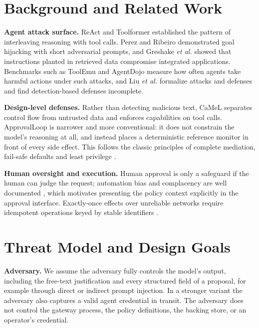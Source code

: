 \documentclass[conference]{IEEEtran}
\begin{document}
\section{Background and Related Work}
\textbf{Agent attack surface.} ReAct \cite{yao2023react} and Toolformer \cite{schick2023toolformer} established the pattern of interleaving reasoning with tool calls. Perez and Ribeiro \cite{perez2022ignore} demonstrated goal hijacking with short adversarial prompts, and Greshake \emph{et al.} \cite{greshake2023indirect} showed that instructions planted in retrieved data compromise integrated applications. Benchmarks such as ToolEmu \cite{ruan2024toolemu} and AgentDojo \cite{debenedetti2024agentdojo} measure how often agents take harmful actions under such attacks, and Liu \emph{et al.} \cite{liu2024formalizing} formalize attacks and defenses and find detection-based defenses incomplete.

\textbf{Design-level defenses.} Rather than detecting malicious text, CaMeL \cite{debenedetti2025camel} separates control flow from untrusted data and enforces capabilities on tool calls. ApprovalLoop is narrower and more conventional: it does not constrain the model's reasoning at all, and instead places a deterministic reference monitor in front of every side effect. This follows the classic principles of complete mediation, fail-safe defaults and least privilege \cite{saltzer1975protection}.

\textbf{Human oversight and execution.} Human approval is only a safeguard if the human can judge the request; automation bias and complacency are well documented \cite{parasuraman2010complacency}, which motivates presenting the policy context explicitly in the approval interface. Exactly-once effects over unreliable networks require idempotent operations keyed by stable identifiers \cite{helland2012idempotence,kleppmann2017ddia}.

\section{Threat Model and Design Goals}
\textbf{Adversary.} We assume the adversary fully controls the model's output, including the free-text justification and every structured field of a proposal, for example through direct or indirect prompt injection. In a stronger variant the adversary also captures a valid agent credential in transit. The adversary does not control the gateway process, the policy definitions, the backing store, or an operator's credential.
\end{document}
